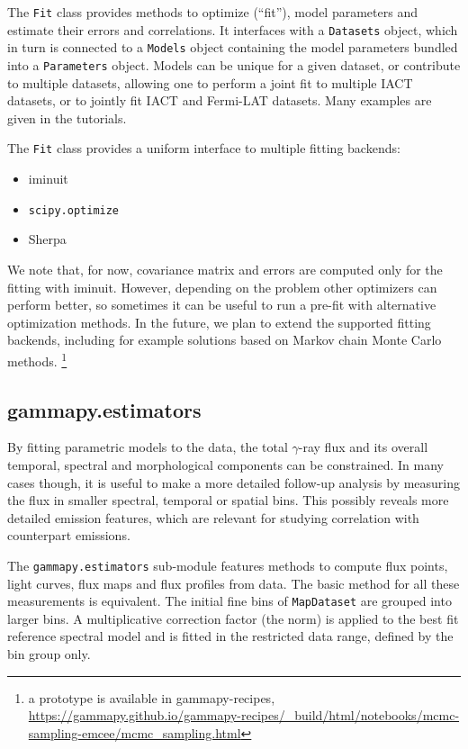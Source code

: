 \documentclass[longauth]{aa}
\newcommand{\code}[1]{\texttt{#1}}
\newcommand{\iminuit}{iminuit\xspace}
\newcommand{\sherpa}{Sherpa\xspace}
\newcommand{\fermi}{Fermi-LAT\xspace}
\newcommand{\gammaray}{$\gamma$-ray\xspace}
\begin{document}
The \code{Fit} class provides methods to optimize (\enquote{fit}), model parameters and estimate
their errors and correlations. It interfaces with a \code{Datasets} object, which
in turn is connected to a \code{Models} object containing the model parameters bundled into a
\code{Parameters} object. Models can be unique for a given dataset, or contribute to
multiple datasets, allowing one to perform a joint fit to
multiple IACT datasets, or to jointly fit IACT and \fermi datasets. Many
examples are given in the tutorials.

The \code{Fit} class provides a uniform interface to multiple fitting backends:
\begin{itemize}
        \setlength\itemsep{1em}
        \item \iminuit~\citep{iminuit}
        \item \code{scipy.optimize}~\citep{2020SciPy-NMeth}
        \item \sherpa~\citep{sherpa-2011, sherpa-2001}
\end{itemize}

We note that, for now, covariance matrix and errors are computed only for the fitting with 
\iminuit. However, depending on
the problem other optimizers can perform better, so sometimes it can be useful
to run a pre-fit with alternative optimization methods. In the future, we plan to
extend the supported fitting backends, including for example solutions based on Markov chain Monte Carlo methods.
\footnote{a prototype is available in gammapy-recipes,
        \url{https://gammapy.github.io/gammapy-recipes/_build/html/notebooks/mcmc-sampling-emcee/mcmc_sampling.html}
}

\subsection{gammapy.estimators}
\label{ssec:gammapy-estimators}
By fitting parametric models to the data, the total \gammaray
flux and its overall temporal, spectral and morphological components can be constrained.
In many cases though, it is useful to make a more detailed follow-up analysis by measuring the
flux in smaller spectral, temporal or spatial bins. This
possibly reveals more detailed emission features, which
are relevant for studying correlation with counterpart emissions.

The \code{gammapy.estimators} sub-module features methods to compute flux
points, light curves, flux maps and flux profiles from data.
The basic method for all these measurements is equivalent.
The initial fine bins of \code{MapDataset} are grouped into
larger bins. A multiplicative correction factor (the norm)
is applied to the best fit reference spectral
model and is fitted in the restricted data range, defined by the 
bin group only.
\end{document}
